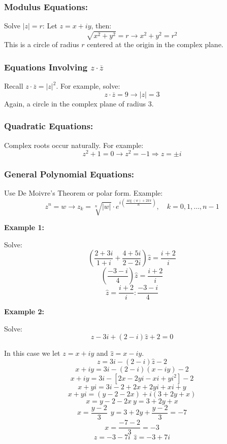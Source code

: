 \subsubsection{Modulus Equations:}

Solve \( |z| = r \):
	      Let \( z = x + iy \), then:
	      \[
		      \sqrt{x^2 + y^2} = r \to x^2 + y^2 = r^2
	      \]
	      This is a circle of radius \( r \) centered at the origin in the complex plane.

\subsubsection{Equations Involving \texorpdfstring{\( z \cdot \overline{z} \)}{}}

Recall \( z \cdot \overline{z} = |z|^2 \).
	      For example, solve:
	      \[
		      z \cdot \overline{z} = 9 \to |z| = 3
	      \]
	      Again, a circle in the complex plane of radius 3.

\subsubsection{Quadratic Equations:}

Complex roots occur naturally. For example:
	      \[
		      z^2 + 1 = 0 \to z^2 = -1 \Rightarrow z = \pm i
	      \]

\subsubsection{General Polynomial Equations:}

 Use De Moivre’s Theorem or polar form. Example:
	      \[
		      z^n = w \to z_k = \sqrt[n]{|w|} \cdot e^{i\left( \frac{\arg(w) + 2k\pi}{n} \right)}, \quad k = 0, 1, \dots, n-1
	      \]

\textbf{Example 1:}
\vspace{\baselineskip}

Solve:
\[
	\left( \frac{2 + 3i}{1 + i} + \frac{4 + 5i}{2 - 2i}\right) \hat{z} = \frac{i + 2}{i}
\]
\[
	\left( \frac{-3 -i}{4} \right) \hat{z} = \frac{i + 2}{i}
\]
\[
	\hat{z} = \frac{i + 2}{i} : \frac{-3 -i}{4}
\]

\textbf{Example 2:}
\vspace{\baselineskip}

Solve:
\[
	z - 3i + (2 -i)\hat{z} + 2 = 0
\]

In this case we let \( z = x + iy \) and \( \hat{z} = x - iy \).
\[
	z = 3i - (2 - i)\hat{z} - 2
\]
\[
	x + iy = 3i - (2 - i)(x - iy) - 2
\]
\[
	x + iy = 3i - [2x - 2yi -xi +yi^2] - 2
\]
\[
	x + yi = 3i - 2 + 2x + 2yi + xi + y
\]
\[
	x + yi = (y - 2 -2x) + i(3 + 2y + x)
\]
\[
	x = y - 2 -2x\ y = 3 + 2y + x
\]
\[
	x = \frac{y - 2}{3}\ \ y = 3 + 2y + \frac{y-2}{3} = -7
\]
\[
	x = \frac{-7 -2}{3} = -3
\]
\[
	z = -3 -7i\ \ \hat{z} = -3 + 7i
\]

